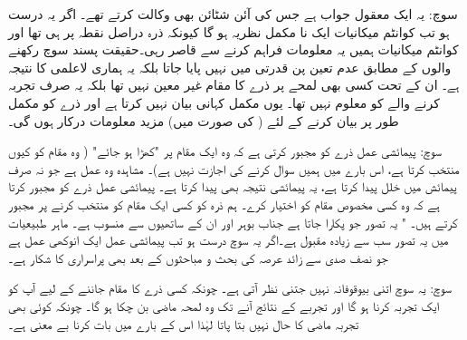 \quad {}
 سوچ:    یہ ایک معقول جواب ہے جس کی آئن شٹائن بھی وکالت کرتے تھے۔ اگر یہ درست ہو تب کوانٹم میکانیات ایک نا مکمل نظریہ ہو گا کیونکہ ذرہ دراصل نقطہ  پر ہی تھا اور کوانٹم میکانیات ہمیں یہ معلومات فراہم کرنے سے قاصر رہی۔حقیقت پسند سوچ رکھنے  والوں کے مطابق عدم تعین پن قدرتی میں نہیں پایا جاتا بلکہ  یہ ہماری لاعلمی کا نتیجہ ہے۔ ان کے تحت کسی بھی لمحے پر ذرے کا مقام غیر معین نہیں تھا بلکہ یہ صرف تجربہ کرنے والے کو معلوم نہیں تھا۔ یوں  مکمل کہانی بیان نہیں کرتا ہے اور ذرے کو مکمل طور پر بیان کرنے کے لئے ( کی صورت میں) مزید معلومات درکار ہوں گی۔

\quad {}
 سوچ:  پیمائشی عمل ذرے کو مجبور کرتی ہے کہ وہ ایک مقام پر "کھڑا ہو جائے" ( وہ مقام  کو کیوں منتخب کرتا ہے،  اس بارے میں ہمیں سوال کرنے کی اجازت نہیں ہے)۔  مشاہدہ وہ عمل ہے جو نہ صرف پیمائش میں خلل پیدا کرتا ہے،  یہ پیمائشی نتیجہ بھی پیدا کرتا ہے۔ پیمائشی عمل ذرے کو مجبور کرتا ہے کہ وہ کسی مخصوص مقام کو اختیار کرے۔ ہم ذرہ کو کسی ایک مقام کو منتخب کرنے پر مجبور کرتے ہیں۔  " یہ تصور جو  پکارا جاتا ہے  جناب بوہر اور ان کے ساتھیوں سے منسوب   ہے۔ ماہر طبیعیات میں یہ تصور سب سے زیادہ مقبول ہے۔اگر یہ سوچ درست ہو تب پیمائشی عمل ایک انوکھی عمل ہے جو نصف صدی سے زائد عرصہ کی بحث و مباحثوں کے بعد  بھی پراسراری کا شکار  ہے۔

\quad {}
 سوچ:  یہ سوچ اتنی بیوقوفانہ نہیں  جتنی نظر آتی ہے۔ چونکہ کسی ذرے کا مقام جاننے کے لیے آپ کو ایک تجربہ کرنا ہو گا اور تجربے کے نتائج آنے تک وہ لمحہ  ماضی  بن چکا ہو گا۔ چونکہ کوئی بھی تجربہ ماضی کا حال نہیں  بتا پاتا لہٰذا اس کے بارے میں بات کرنا بے معنی ہے۔ 

